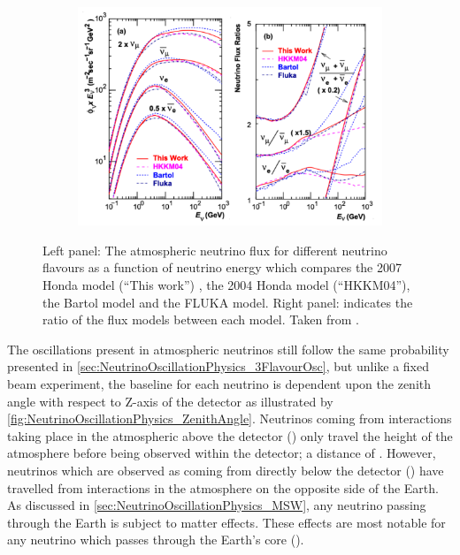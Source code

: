 \begin{figure}[h]
  \begin{subfigure}[t]{0.80\textwidth}
    \includegraphics[width=\textwidth, trim={0mm 0mm 0mm 0mm}, clip,page=1]{Figures/Theory/AtmosphericNuFlux.pdf}
  \end{subfigure}
  \caption{Left panel: The atmospheric neutrino flux for different neutrino flavours as a function of neutrino energy which compares the 2007 Honda model (``This work'') \cite{Honda_2007}, the 2004 Honda model (``HKKM04'')\cite{PhysRevD.70.043008}, the Bartol model \cite{Barr_2004} and the FLUKA model. Right panel: indicates the ratio of the flux models between each model. Taken from \cite{Honda_2007}.}
  \label{fig:NeutrinoOscillationPhysics_AtmosphericNeutrinoFlux}
\end{figure}

The oscillations present in atmospheric neutrinos still follow the same  probability presented in \autoref{sec:NeutrinoOscillationPhysics_3FlavourOsc}, but unlike a fixed beam experiment, the baseline for each neutrino is dependent upon the zenith angle with respect to Z-axis of the detector as illustrated by \autoref{fig:NeutrinoOscillationPhysics_ZenithAngle}. Neutrinos coming from interactions taking place in the atmospheric above the detector () only travel the height of the atmosphere before being observed within the detector; a distance of . However, neutrinos which are observed as coming from directly below the detector () have travelled  from interactions in the atmosphere on the opposite side of the Earth. As discussed in \autoref{sec:NeutrinoOscillationPhysics_MSW}, any neutrino passing through the Earth is subject to matter effects. These effects are most notable for any neutrino which passes through the Earth's core ().

